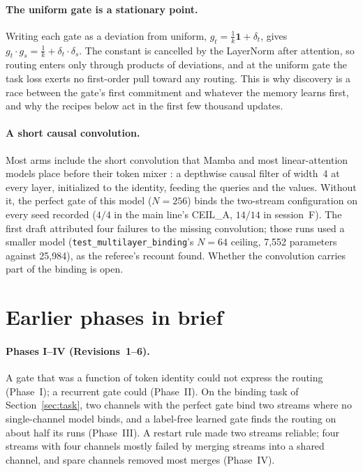 \documentclass[11pt]{article}
\newcommand{\arm}[1]{\textsf{#1}}
\begin{document}
\paragraph{The uniform gate is a stationary point.} Writing each gate as a deviation from uniform, $g_t = \tfrac{1}{k}\mathbf{1} + \delta_t$, gives $g_t \cdot g_s = \tfrac{1}{k} + \delta_t \cdot \delta_s$. The constant is cancelled by the LayerNorm after attention, so routing enters only through products of deviations, and at the uniform gate the task loss exerts no first-order pull toward any routing. This is why discovery is a race between the gate's first commitment and whatever the memory learns first, and why the recipes below act in the first few thousand updates.

\paragraph{A short causal convolution.} Most arms include the short convolution that Mamba and most linear-attention models place before their token mixer \cite{mamba}: a depthwise causal filter of width~4 at every layer, initialized to the identity, feeding the queries and the values. Without it, the perfect gate of this model ($N = 256$) binds the two-stream configuration on every seed recorded ($4/4$ in the main line's \arm{CEIL\_A}, $14/14$ in session~F). The first draft attributed four failures to the missing convolution; those runs used a smaller model (\texttt{test\_multilayer\_binding}'s $N = 64$ ceiling, 7{,}552 parameters against 25{,}984), as the referee's recount found. Whether the convolution carries part of the binding is open.

\section{Earlier phases in brief}
\label{sec:prior}

\paragraph{Phases I--IV (Revisions~1--6).} A gate that was a function of token identity could not express the routing (Phase~I); a recurrent gate could (Phase~II). On the binding task of Section~\ref{sec:task}, two channels with the perfect gate bind two streams where no single-channel model binds, and a label-free learned gate finds the routing on about half its runs (Phase~III). A restart rule made two streams reliable; four streams with four channels mostly failed by merging streams into a shared channel, and spare channels removed most merges (Phase~IV).
\end{document}
